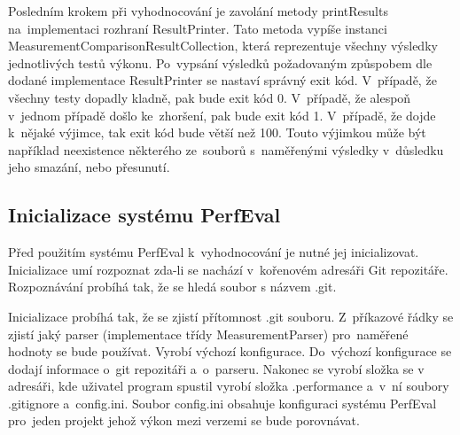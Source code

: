 Posledním krokem při vyhodnocování je zavolání metody printResults na~implementaci rozhraní ResultPrinter. Tato metoda
vypíše instanci MeasurementComparisonResultCollection, která reprezentuje všechny výsledky jednotlivých testů výkonu.
Po~vypsání výsledků požadovaným způspobem dle dodané implementace ResultPrinter se nastaví správný exit kód. V~případě,
že všechny testy dopadly kladně, pak bude exit kód 0. V~případě, že alespoň v~jednom případě došlo ke~zhoršení, pak bude
exit kód 1. V~případě, že dojde k~nějaké výjimce, tak exit kód bude větší než 100. Touto výjimkou může být například
neexistence některého ze~souborů s~naměřenými výsledky v~důsledku jeho smazání, nebo přesunutí.

\subsection{Inicializace systému PerfEval}

Před použitím systému PerfEval k~vyhodnocování je nutné jej inicializovat. Inicializace umí rozpoznat zda-li se nachází
v~kořenovém adresáři Git repozitáře. Rozpoznávání probíhá tak, že se hledá soubor s názvem .git.

Inicializace probíhá tak, že se zjistí přítomnost .git souboru. Z~příkazové řádky se zjistí jaký parser (implementace
třídy MeasurementParser) pro~naměřené hodnoty se bude používat. Vyrobí výchozí konfigurace. Do~výchozí konfigurace
se dodají informace o~git repozitáři a~o~parseru. Nakonec se vyrobí složka se v adresáři, kde uživatel program spustil
vyrobí složka .performance a~v~ní soubory .gitignore a~config.ini. Soubor config.ini obsahuje konfiguraci systému PerfEval
pro~jeden projekt jehož výkon mezi verzemi se bude porovnávat.

